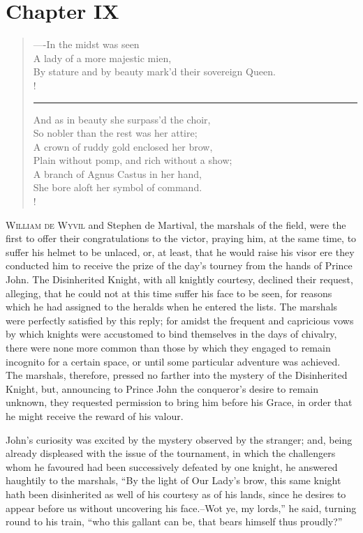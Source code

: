\chapter{Chapter IX}

\begin{verse}
----In the midst was seen\\
A lady of a more majestic mien,\\
By stature and by beauty mark'd their sovereign Queen.\\!
\rule{.7\textwidth}{.2pt}

And as in beauty she surpass'd the choir,\\
So nobler than the rest was her attire;\\
A crown of ruddy gold enclosed her brow,\\
Plain without pomp, and rich without a show;\\
A branch of Agnus Castus in her hand,\\
She bore aloft her symbol of command.\\!
\end{verse}

\lettrine{W}{illiam de Wyvil} and Stephen de Martival, the marshals of
the field,
were the first to offer their congratulations to the victor, praying
him, at the same time, to suffer his helmet to be unlaced, or, at least,
that he would raise his visor ere they conducted him to receive the
prize of the day's tourney from the hands of Prince John. The
Disinherited Knight, with all knightly courtesy, declined their request,
alleging, that he could not at this time suffer his face to be seen, for
reasons which he had assigned to the heralds when he entered the lists.
The marshals were perfectly satisfied by this reply; for amidst the
frequent and capricious vows by which knights were accustomed to bind
themselves in the days of chivalry, there were none more common than
those by which they engaged to remain incognito for a certain space, or
until some particular adventure was achieved. The marshals, therefore,
pressed no farther into the mystery of the Disinherited Knight, but,
announcing to Prince John the conqueror's desire to remain unknown, they
requested permission to bring him before his Grace, in order that he
might receive the reward of his valour.

John's curiosity was excited by the mystery observed by the stranger;
and, being already displeased with the issue of the tournament, in which
the challengers whom he favoured had been successively defeated by one
knight, he answered haughtily to the marshals, ``By the light of Our
Lady's brow, this same knight hath been disinherited as well of his
courtesy as of his lands, since he desires to appear before us without
uncovering his face.--Wot ye, my lords,'' he said, turning round to his
train, ``who this gallant can be, that bears himself thus proudly?''

